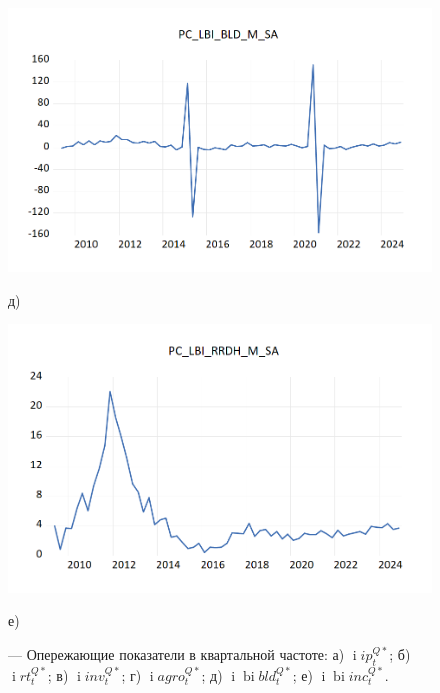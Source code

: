 \documentclass[a4paper, 14pt]{extreport}
\numberwithin{equation}{section}
\renewcommand{\i}{\operatorname{i}}
\newcommand{\bi}{\operatorname{bi}}
\numberwithin{equation}{section}
\begin{document}
\begin{figure}[h!]
		\begin{minipage}{0.5\textwidth}
			\centering
			\includegraphics[scale=0.4]{images/image33}
			\caption*{д)}
		\end{minipage}%
		\hfill %
		\begin{minipage}{0.5\textwidth}
			\centering
			\includegraphics[scale=0.4]{images/image34}
			\caption*{е)}
		\end{minipage}

		\caption{\centering --- Опережающие показатели в квартальной частоте: а) $\i ip_t^{Q*}$; б) $\i rt_t^{Q*}$; в) $\i inv_t^{Q*}$; г) $\i agro_t^{Q*}$; д) $\i \bi bld_t^{Q*}$; е) $\i \bi inc_t^{Q*}$.}
		\label{fig:ts-4}
	\end{figure}
	
\end{document}
